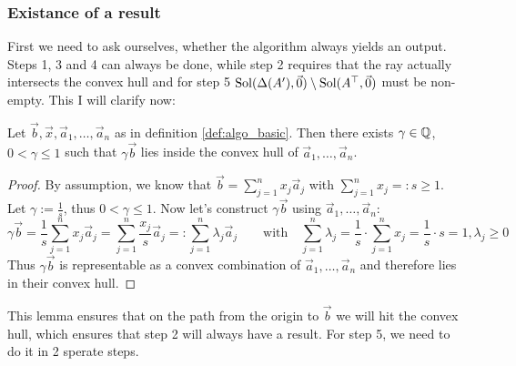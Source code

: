\subsubsection{Existance of a result}
First we need to ask ourselves, whether the algorithm always yields an output. Steps 1, 3 and 4 can always be done, while step 2 requires that the ray actually intersects the convex hull and for step 5 $\operatorname{Sol}(\Delta(A'), \vec0) \setminus \operatorname{Sol}(A^\top, \vec0)$ must be non-empty. This I will clarify now:

\begin{lemma}
    \label{lemma:b_behind_hull}
    Let $\vec b, \vec x, \vec a_1, \dots, \vec a_n$ as in definition \ref{def:algo_basic}. Then there exists $\gamma \in \mathbb{Q}$, $0 < \gamma \leq 1$ such that $\gamma \vec b$ lies inside the convex hull of $\vec a_1, \dots, \vec a_n$.
\end{lemma}
\begin{proof}
    By assumption, we know that $\vec b = \sum_{j=1}^{n}x_j \vec a_j$ with $\sum_{j=1}^{n}x_j =: s \geq 1$. Let $\gamma := \frac{1}{s}$, thus $0 < \gamma \leq 1$. Now let's construct $\gamma\vec b$ using $\vec a_1, \dots, \vec a_n$:
    $$\gamma\vec b = \frac{1}{s}\sum_{j=1}^{n}x_j \vec a_j = \sum_{j=1}^{n}\frac{x_j}{s}\vec a_j =: \sum_{j=1}^{n} \lambda_j\vec a_j \qquad \mathrm{with}\quad \sum_{j=1}^{n}\lambda_j = \frac{1}{s}\cdot \sum_{j=1}^{n} x_j = \frac{1}{s}\cdot s = 1, \lambda_j \geq 0$$
    Thus $\gamma\vec b$ is representable as a convex combination of $\vec a_1, \dots, \vec a_n$ and therefore lies in their convex hull.
\end{proof}
This lemma ensures that on the path from the origin to $\vec b$ we will hit the convex hull, which ensures that step 2 will always have a result. For step 5, we need to do it in 2 sperate steps.

